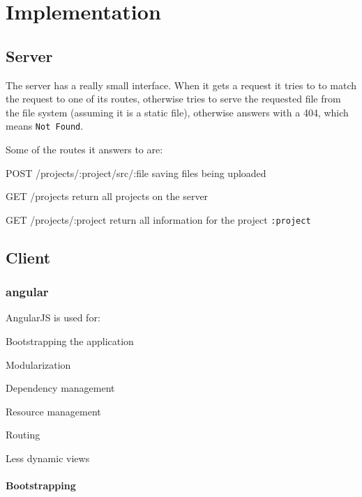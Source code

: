 
\section{Implementation}
\label{implementation}

\subsection{Server}

The server has a really small interface.
When it gets a request it tries to to match the request to one of its routes, otherwise tries to serve the requested file from the file system (assuming it is a static file), otherwise answers with a 404, which means \texttt{Not Found}.

Some of the routes it answers to are:
\begin{description*}
  \item[POST /projects/:project/src/:file]
    saving files being uploaded
  \item[GET /projects]
    return all projects on the server
  \item[GET /projects/:project]
    return all information for the project \texttt{:project}
\end{description*}

\subsection{Client}

\subsubsection{angular}
\label{angular}

AngularJS is used for:

\begin{itemize*}
  \item Bootstrapping the application
  \item Modularization
  \item Dependency management
  \item Resource management
  \item Routing
  \item Less dynamic views
\end{itemize*}

\paragraph{Bootstrapping}
\label{par:Bootstrapping and Routing}

